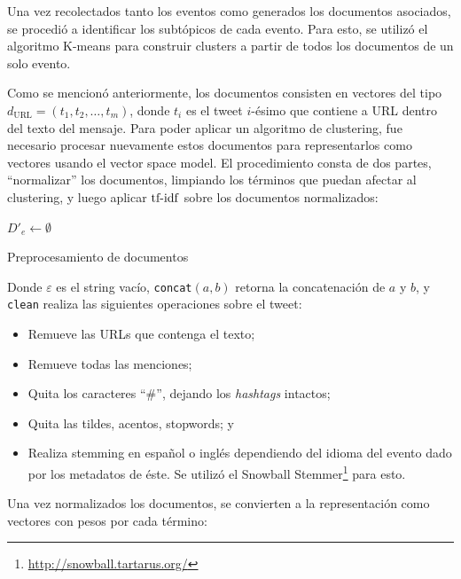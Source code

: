     Una vez recolectados tanto los eventos como generados los
    documentos asociados, se procedió a identificar los subtópicos de
    cada evento. Para esto, se utilizó el algoritmo K-means para
    construir clusters a partir de todos los documentos de un solo
    evento.

    Como se mencionó anteriormente, los documentos consisten en
    vectores del tipo $d_{\textrm{URL}}=(t_1,t_2,\ldots,t_m)$, donde
    $t_i$ es el tweet $i$-ésimo que contiene a URL dentro del texto
    del mensaje. Para poder aplicar un algoritmo de clustering, fue
    necesario procesar nuevamente estos documentos para representarlos
    como vectores usando el vector space model. El procedimiento
    consta de dos partes, ``normalizar'' los documentos, limpiando los
    términos que puedan afectar al clustering, y luego aplicar
    $\operatorname{tf-idf}$ sobre los documentos normalizados:

\begin{algorithm}[H]
 $D'_e \leftarrow \emptyset$\;
 \caption{Preprocesamiento de documentos}
\end{algorithm}

    Donde $\varepsilon$ es el string vacío, \texttt{concat}$(a,b)$ retorna
    la concatenación de $a$ y $b$, y \texttt{clean} realiza las siguientes
    operaciones sobre el tweet:

\begin{itemize}
\item Remueve las URLs que contenga el texto;
\item Remueve todas las menciones;
\item Quita los caracteres ``\#'', dejando los \emph{hashtags} intactos;
\item Quita las tildes, acentos, stopwords; y
\item Realiza stemming en español o inglés dependiendo del idioma del
      evento dado por los metadatos de éste. Se utilizó el Snowball
      Stemmer\footnote{\href{http://snowball.tartarus.org/}{http://snowball.tartarus.org/} } para esto.
\end{itemize}
    Una vez normalizados los documentos, se convierten a la
    representación como vectores con pesos por cada término:

